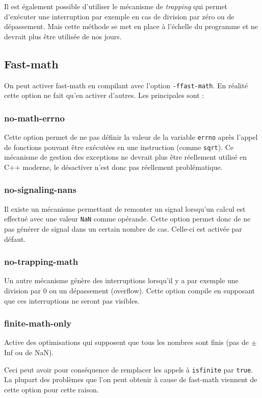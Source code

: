 \documentclass[a4paper,11pt]{report}
\begin{document}
Il est également possible d'utiliser le mécanisme de \emph{trapping} qui permet d'exécuter une interruption par exemple en cas de division par zéro ou de dépassement.
Mais cette méthode se met en place à l'échelle du programme et ne devrait plus être utilisée de nos jours.

\subsection{Fast-math}
On peut activer fast-math en compilant avec l'option \verb'-ffast-math'.
En réalité cette option ne fait qu'en activer d'autres.
Les principales sont :

\subsubsection{no-math-errno}
Cette option permet de ne pas définir la valeur de la variable \verb'errno' après l'appel de fonctions pouvant être exécutées en une instruction (comme \verb'sqrt').
Ce mécanisme de gestion des exceptions ne devrait plus être réellement utilisé en C++ moderne, le désactiver n'est donc pas réellement problématique.

\subsubsection{no-signaling-nans}
Il existe un mécanisme permettant de remonter un signal lorsqu'un calcul est effectué avec une valeur \verb'NaN' comme opérande.
Cette option permet donc de ne pas générer de signal dans un certain nombre de cas.
Celle-ci est activée par défaut.

\subsubsection{no-trapping-math}
Un autre mécanisme génère des interruptions lorsqu'il y a par exemple une division par 0 ou un dépassement (overflow).
Cette option compile en supposant que ces interruptions ne seront pas visibles.

\subsubsection{finite-math-only}
Active des optimisations qui supposent que tous les nombres sont finis (pas de $\pm$Inf ou de NaN).

Ceci peut avoir pour conséquence de remplacer les appels à \verb'isfinite' par \verb'true'.
La plupart des problèmes que l'on peut obtenir à cause de fast-math viennent de cette option pour cette raison.
\end{document}
